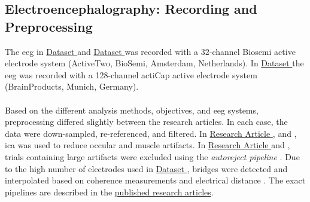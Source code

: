 \subsection{Electroencephalography: Recording and Preprocessing}
The \gls{eeg} in \hyperref[methods:datasets:I]{Dataset } and \hyperref[methods:datasets:II]{Dataset } was recorded with a 32-channel Biosemi active electrode system (ActiveTwo, BioSemi, Amsterdam, Netherlands). In \hyperref[methods:datasets:III]{Dataset } the \gls{eeg} was recorded with a 128-channel actiCap active electrode system (BrainProducts, Munich, Germany).\\
\\
Based on the different analysis methods, objectives, and \gls{eeg} systems, preprocessing differed slightly between the research articles. In each case, the data were down-sampled, re-referenced, and filtered. In \hyperref[results:paperI]{Research Article }, \hyperref[results:paperIII]{} and \hyperref[results:paperIV]{}, \gls{ica} was used to reduce occular and muscle artifacts. In \hyperref[results:paperI]{Research Article } and \hyperref[results:paperIV]{}, trials containing large artifacts were excluded using the \textit{autoreject pipeline} \cite{Jas2017}. Due to the high number of electrodes used in \hyperref[methods:datasets:III]{Dataset }, bridges were detected and interpolated based on coherence measurements and electrical distance \cite{Alschuler2014}. The exact pipelines are described in the \hyperref[pub:papers]{published research articles}.  
\newpage

